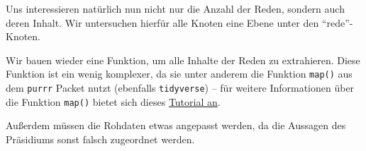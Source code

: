 \documentclass[oneside, 12pt, numbers=endperiod]{scrbook}
\newenvironment{Shaded}{\begin{snugshade}}{\end{snugshade}}
\newcommand{\KeywordTok}[1]{\textcolor[rgb]{0.13,0.29,0.53}{\textbf{#1}}}
\newcommand{\NormalTok}[1]{#1}
\newcommand{\OperatorTok}[1]{\textcolor[rgb]{0.81,0.36,0.00}{\textbf{#1}}}
\newcommand{\StringTok}[1]{\textcolor[rgb]{0.31,0.60,0.02}{#1}}
\theoremstyle{definition}
\theoremstyle{definition}
\theoremstyle{definition}
\theoremstyle{remark}
\begin{document}
Uns interessieren natürlich nun nicht nur die Anzahl der Reden, sondern
auch deren Inhalt. Wir untersuchen hierfür alle Knoten eine Ebene unter
den ``rede''-Knoten.

\begin{Shaded}
\end{Shaded}

Wir bauen wieder eine Funktion, um alle Inhalte der Reden zu
extrahieren. Diese Funktion ist ein wenig komplexer, da sie unter
anderem die Funktion \texttt{map()} aus dem \texttt{purrr} Packet nutzt
(ebenfalls \texttt{tidyverse}) -- für weitere Informationen über die
Funktion \texttt{map()} bietet sich dieses
\href{https://jennybc.github.io/purrr-tutorial/}{Tutorial an}.

Außerdem müssen die Rohdaten etwas angepasst werden, da die Aussagen des
Präsidiums sonst falsch zugeordnet werden.
\end{document}
